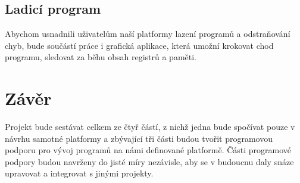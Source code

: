 \subsection{Ladicí program}

Abychom usnadnili uživatelům naší platformy lazení programů a odstraňování chyb, bude součástí práce i grafická aplikace, která umožní krokovat chod programu, sledovat za běhu obsah registrů a paměti.

\section{Závěr}

Projekt bude sestávat celkem ze čtyř částí, z nichž jedna bude spočívat pouze v návrhu samotné platformy a zbývající tři části budou tvořit programovou podporu pro vývoj programů na námi definované platformě. Části programové podpory budou navrženy do jisté míry nezávisle, aby se v budoucnu daly snáze upravovat a integrovat s jinými projekty.
